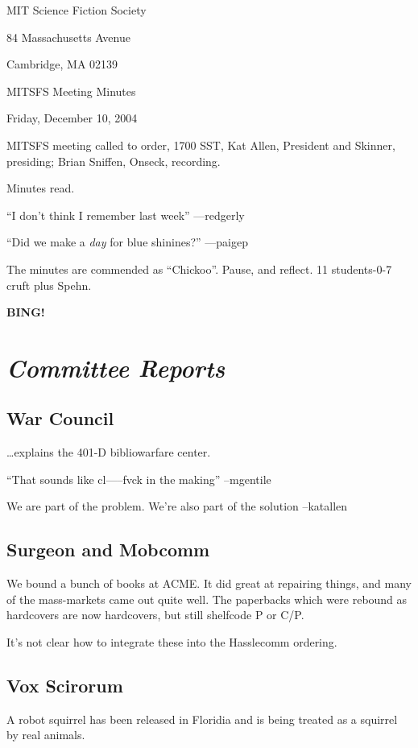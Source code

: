 \documentclass[10pt]{article}
\newcommand{\bing}{{\bf BING!} }
\newcommand{\goto}[1]{\bing \vskip 12pt \section*{{\em{#1}}}}
\newcommand{\ps}{ plus Spehn\xspace}
\begin{document}
\begin{center}

MIT Science Fiction Society

84 Massachusetts Avenue

Cambridge, MA 02139

\vspace{12pt}

MITSFS Meeting Minutes

Friday, December 10, 2004

\end{center}

\vspace{18pt}

\setlength{\parskip}{6pt}

\noindent
MITSFS meeting called to order, 1700 SST, Kat Allen, President and
Skinner, presiding; Brian Sniffen,  Onseck, recording.

Minutes read.

``I don't think I remember last week'' ---redgerly

``Did we make a \emph{day} for blue shinines?'' ---paigep

The minutes are commended as ``Chickoo''.  Pause, and reflect.  11
students-0-7 cruft \ps.

\goto{Committee Reports}
\subsection*{War Council}
\dots explains the 401-D bibliowarfare center.

``That sounds like cl-----fvck in the making'' --mgentile

We are part of the problem.  We're also part of the solution --katallen

\subsection*{Surgeon and Mobcomm}
We bound a bunch of books at ACME.  It did great at repairing things,
and many of the mass-markets came out quite well.  The paperbacks
which were rebound as hardcovers are now hardcovers, but still
shelfcode P or C/P.

It's not clear how to integrate these into the Hasslecomm ordering.

\subsection*{Vox Scirorum}
A robot squirrel has been released in Floridia and is being treated
as a squirrel by real animals.
\end{document}
